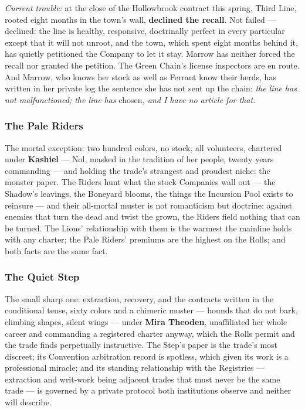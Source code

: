 \textit{Current trouble:} at the close of the Hollowbrook contract this spring, Third Line, rooted eight months in the town's wall, \textbf{declined the recall}. Not failed --- declined: the line is healthy, responsive, doctrinally perfect in every particular except that it will not unroot, and the town, which spent eight months behind it, has quietly petitioned the Company to let it stay. Marrow has neither forced the recall nor granted the petition. The Green Chain's license inspectors are en route. And Marrow, who knows her stock as well as Ferrant know their herds, has written in her private log the sentence she has not sent up the chain: \textit{the line has not malfunctioned; the line has} chosen\textit{, and I have no article for that.}

\subsubsection{The Pale Riders}

The mortal exception: two hundred colors, no stock, all volunteers, chartered under \textbf{Kashiel} --- Nol, masked in the tradition of her people, twenty years commanding --- and holding the trade's strangest and proudest niche: the monster paper. The Riders hunt what the stock Companies wall out --- the Shadow's leavings, the Boneyard blooms, the things the Incursion Pool exists to reinsure --- and their all-mortal muster is not romanticism but doctrine: against enemies that turn the dead and twist the grown, the Riders field nothing that can be turned. The Lions' relationship with them is the warmest the mainline holds with any charter; the Pale Riders' premiums are the highest on the Rolls; and both facts are the same fact.

\subsubsection{The Quiet Step}

The small sharp one: extraction, recovery, and the contracts written in the conditional tense, sixty colors and a chimeric muster --- hounds that do not bark, climbing shapes, silent wings --- under \textbf{Mira Theoden}, unaffiliated her whole career and commanding a registered charter anyway, which the Rolls permit and the trade finds perpetually instructive. The Step's paper is the trade's most discreet; its Convention arbitration record is spotless, which given its work is a professional miracle; and its standing relationship with the Registries --- extraction and writ-work being adjacent trades that must never be the same trade --- is governed by a private protocol both institutions observe and neither will describe.

